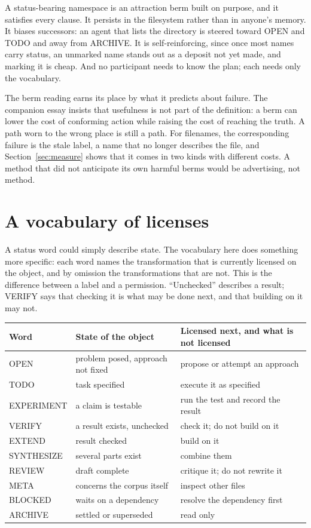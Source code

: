 \documentclass[11pt]{article}
\newcommand{\st}[1]{\textsf{#1}}
\begin{document}
A status-bearing namespace is an attraction berm built on purpose, and it satisfies every clause. It persists in the filesystem rather than in anyone's memory. It biases successors: an agent that lists the directory is steered toward \st{OPEN} and \st{TODO} and away from \st{ARCHIVE}. It is self-reinforcing, since once most names carry status, an unmarked name stands out as a deposit not yet made, and marking it is cheap. And no participant needs to know the plan; each needs only the vocabulary.

The berm reading earns its place by what it predicts about failure. The companion essay insists that usefulness is not part of the definition: a berm can lower the cost of conforming action while raising the cost of reaching the truth. A path worn to the wrong place is still a path. For filenames, the corresponding failure is the stale label, a name that no longer describes the file, and Section~\ref{sec:measure} shows that it comes in two kinds with different costs. A method that did not anticipate its own harmful berms would be advertising, not method.

\section{A vocabulary of licenses}\label{sec:vocab}

A status word could simply describe state. The vocabulary here does something more specific: each word names the transformation that is currently licensed on the object, and by omission the transformations that are not. This is the difference between a label and a permission. ``Unchecked'' describes a result; \st{VERIFY} says that checking it is what may be done next, and that building on it may not.

\begin{center}
\small
\begin{tabular}{lll}
\toprule
Word & State of the object & Licensed next, and what is not licensed \\
\midrule
\st{OPEN} & problem posed, approach not fixed & propose or attempt an approach \\
\st{TODO} & task specified & execute it as specified \\
\st{EXPERIMENT} & a claim is testable & run the test and record the result \\
\st{VERIFY} & a result exists, unchecked & check it; do not build on it \\
\st{EXTEND} & result checked & build on it \\
\st{SYNTHESIZE} & several parts exist & combine them \\
\st{REVIEW} & draft complete & critique it; do not rewrite it \\
\st{META} & concerns the corpus itself & inspect other files \\
\st{BLOCKED} & waits on a dependency & resolve the dependency first \\
\st{ARCHIVE} & settled or superseded & read only \\
\bottomrule
\end{tabular}
\end{center}
\end{document}
